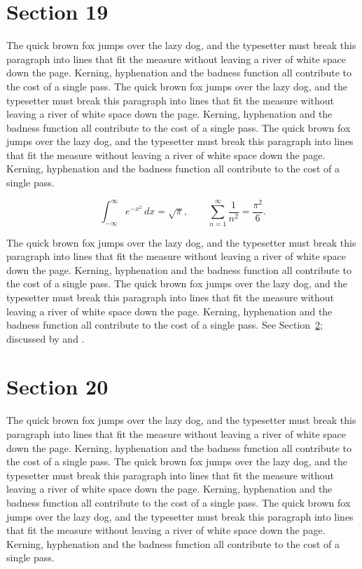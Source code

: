 \documentclass{article}
\begin{document}
\section{Section 19}
\label{sec:19}
The quick brown fox jumps over the lazy dog, and the typesetter must break this paragraph into lines that fit the measure without leaving a river of white space down the page. Kerning, hyphenation and the badness function all contribute to the cost of a single pass. The quick brown fox jumps over the lazy dog, and the typesetter must break this paragraph into lines that fit the measure without leaving a river of white space down the page. Kerning, hyphenation and the badness function all contribute to the cost of a single pass. The quick brown fox jumps over the lazy dog, and the typesetter must break this paragraph into lines that fit the measure without leaving a river of white space down the page. Kerning, hyphenation and the badness function all contribute to the cost of a single pass. 

\begin{equation}\label{eq:19}
\int_{-\infty}^{\infty} e^{-x^{2}}\,dx = \sqrt{\pi}, \qquad
\sum_{n=1}^{\infty} \frac{1}{n^{2}} = \frac{\pi^{2}}{6}.
\end{equation}

The quick brown fox jumps over the lazy dog, and the typesetter must break this paragraph into lines that fit the measure without leaving a river of white space down the page. Kerning, hyphenation and the badness function all contribute to the cost of a single pass. The quick brown fox jumps over the lazy dog, and the typesetter must break this paragraph into lines that fit the measure without leaving a river of white space down the page. Kerning, hyphenation and the badness function all contribute to the cost of a single pass. 
See Section~\ref{sec:20}; discussed by \textcite{k5} and \textcite{l2}.
\section{Section 20}
\label{sec:20}
The quick brown fox jumps over the lazy dog, and the typesetter must break this paragraph into lines that fit the measure without leaving a river of white space down the page. Kerning, hyphenation and the badness function all contribute to the cost of a single pass. The quick brown fox jumps over the lazy dog, and the typesetter must break this paragraph into lines that fit the measure without leaving a river of white space down the page. Kerning, hyphenation and the badness function all contribute to the cost of a single pass. The quick brown fox jumps over the lazy dog, and the typesetter must break this paragraph into lines that fit the measure without leaving a river of white space down the page. Kerning, hyphenation and the badness function all contribute to the cost of a single pass. 
\end{document}
